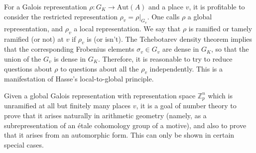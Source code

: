 \documentclass[12pt]{article}
\newcommand{\Aut}{\mathrm{Aut}}
\newcommand{\bbZ}{\mathbb{Z}}
\newcommand{\cn}{\colon}
\begin{document}
For a Galois representation $\rho \cn G_K \to \Aut(A)$ and a place $v$, it is profitable to consider the restricted representation $\rho_v = \rho|_{G_v}$.  One calls $\rho$ a global representation, and $\rho_v$ a local representation.  We say that $\rho$ is ramified or tamely ramified (or not) at $v$ if $\rho_v$ is (or isn't).  The Tchebotarev density theorem implies that the corresponding Frobenius elements $\sigma_v \in G_v$ are dense in $G_K$, so that the union of the $G_v$ is dense in $G_K$.  Therefore, it is reasonable to try to reduce questions about $\rho$ to questions about all the $\rho_v$ independently.  This is a manifestation of Hasse's local-to-global principle.

Given a global Galois representation with representation space $\bbZ_p^n$ which is unramified at all but finitely many places $v$, it is a goal of number theory to prove that it arises naturally in arithmetic geometry (namely, as a subrepresentation of an \'etale cohomology group of a motive), and also to prove that it arises from an automorphic form.  This can only be shown in certain special cases.
\end{document}
